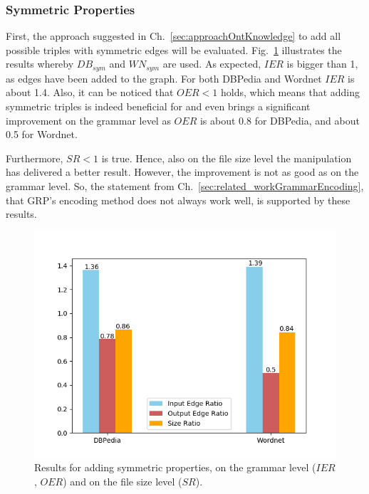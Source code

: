 \subsubsection{Symmetric Properties}

First, the approach suggested in Ch.~\ref{sec:approachOntKnowledge} to add all possible triples with symmetric edges will be evaluated. Fig.~\ref{fig:symmetricAddResults} illustrates the results whereby $DB_{sym}$ and $WN_{sym}$ are used. As expected, $IER$ is bigger than 1, as edges have been added to the graph. For both DBPedia and Wordnet $IER$ is about 1.4. Also, it can be noticed that $OER<1$ holds, which means that adding symmetric triples is indeed beneficial for \GGRP{} and even brings a significant improvement on the grammar level as $OER$ is about 0.8 for DBPedia, and about 0.5 for Wordnet.

Furthermore, $SR<1$ is true. Hence, also on the file size level the manipulation has delivered a better result. However, the improvement is not as good as on the grammar level. So, the statement from Ch.~\ref{sec:related_workGrammarEncoding}, that GRP's encoding method does not always work well, is supported by these results. 



\begin{figure}
	\centering
	\includegraphics[width=0.8\linewidth]{figures/4_evaluation/ontology/ratiosSymmetricsAdd}
	\caption{Results for adding symmetric properties, on the grammar level ($IER$, $OER$) and on the file size level ($SR$).}
	\label{fig:symmetricAddResults}
\end{figure}



